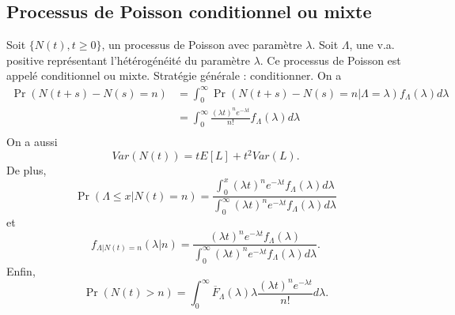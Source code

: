 \subsection{Processus de Poisson conditionnel ou mixte}

Soit $\{N(t), t\geq 0\}$, un processus de Poisson avec paramètre $\lambda$. Soit $\Lambda$, une v.a. positive représentant l'hétérogénéité du paramètre $\lambda$. Ce processus de Poisson est appelé conditionnel ou mixte. Stratégie générale : conditionner. On a 
\begin{align*}
	\Pr(N(t + s) - N(s) = n) &= \int_{0}^{\infty}\Pr(N(t + s) - N(s) = n \vert \Lambda=\lambda) f_\Lambda(\lambda)d\lambda\\
	&= \int_{0}^{\infty}\frac{(\lambda t)^n e^{-\lambda t}}{n!} f_\Lambda(\lambda)d\lambda\\
\end{align*}
On a aussi 
$$Var(N(t)) = tE[L] + t^2Var(L).$$
De plus, 
$$\Pr(\Lambda \leq x \vert N(t) = n) = \frac{\int_{0}^{x}(\lambda t)^ne^{-\lambda t}f_\Lambda(\lambda) d\lambda }{\int_{0}^{\infty}(\lambda t)^ne^{-\lambda t}f_\Lambda(\lambda) d\lambda }$$
et
$$f_{\Lambda \vert N(t) = n}(\lambda \vert n) = \frac{(\lambda t)^ne^{-\lambda t}f_\Lambda(\lambda)}{\int_{0}^{\infty}(\lambda t)^ne^{-\lambda t}f_\Lambda(\lambda) d\lambda }.$$
Enfin, 
$$\Pr(N(t) > n) = \int_{0}^{\infty}\overline{F}_\Lambda(\lambda)\lambda \frac{(\lambda t)^n e^{-\lambda t}}{n!}d\lambda.$$




















































